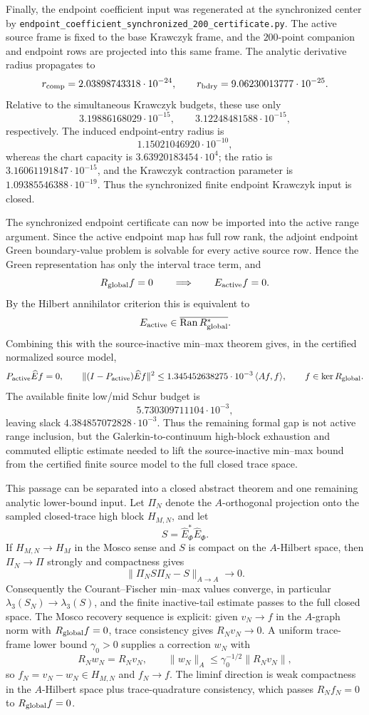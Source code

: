 \documentclass[11pt]{article}
\begin{document}
Finally, the endpoint coefficient input was regenerated at the synchronized
center by
\texttt{endpoint\_coefficient\_synchronized\_200\_certificate.py}.  The active
source frame is fixed to the base Krawczyk frame, and the \(200\)-point
companion and endpoint rows are projected into this same frame.  The analytic
derivative radius propagates to
\[
  r_{\rm comp}=2.03898743318\cdot10^{-24},\qquad
  r_{\rm bdry}=9.06230013777\cdot10^{-25}.
\]
Relative to the simultaneous Krawczyk budgets, these use only
\[
  3.19886168029\cdot10^{-15},\qquad
  3.12248481588\cdot10^{-15},
\]
respectively.  The induced endpoint-entry radius is
\[
  1.15021046920\cdot10^{-10},
\]
whereas the chart capacity is \(3.63920183454\cdot10^{4}\); the ratio is
\(3.16061191847\cdot10^{-15}\), and the Krawczyk contraction parameter is
\(1.09385546388\cdot10^{-19}\).  Thus the synchronized finite endpoint
Krawczyk input is closed.

The synchronized endpoint certificate can now be imported into the active range
argument.  Since the active endpoint map has full row rank, the adjoint endpoint
Green boundary-value problem is solvable for every active source row.  Hence
the Green representation has only the interval trace term, and
\[
  R_{\rm global}f=0 \qquad\Longrightarrow\qquad E_{\rm active}f=0.
\]
By the Hilbert annihilator criterion this is equivalent to
\[
  E_{\rm active}\in \overline{\operatorname{Ran}R_{\rm global}^{\ast}}.
\]
Combining this with the source-inactive min--max theorem gives, in the
certified normalized source model,
\[
  P_{\rm active}\widehat E f=0,\qquad
  \|(I-P_{\rm active})\widehat E f\|^2
  \le 1.345452638275\cdot10^{-3}\,\langle Af,f\rangle,
  \qquad f\in\ker R_{\rm global}.
\]
The available finite low/mid Schur budget is
\[
  5.730309711104\cdot10^{-3},
\]
leaving slack \(4.384857072828\cdot10^{-3}\).  Thus the remaining formal gap is
not active range inclusion, but the Galerkin-to-continuum high-block exhaustion
and commuted elliptic estimate needed to lift the source-inactive min--max bound
from the certified finite source model to the full closed trace space.

This passage can be separated into a closed abstract theorem and one remaining
analytic lower-bound input.  Let \(\Pi_N\) denote the \(A\)-orthogonal projection
onto the sampled closed-trace high block \(H_{M,N}\), and let
\[
  S=\widehat E_\Phi^\ast \widehat E_\Phi .
\]
If \(H_{M,N}\to H_M\) in the Mosco sense and \(S\) is compact on the
\(A\)-Hilbert space, then \(\Pi_N\to \Pi\) strongly and compactness gives
\[
  \|\Pi_N S\Pi_N-S\|_{A\to A}\to0.
\]
Consequently the Courant--Fischer min--max values converge, in particular
\(\lambda_3(S_N)\to\lambda_3(S)\), and the finite inactive-tail estimate passes
to the full closed space.  The Mosco recovery sequence is explicit: given
\(v_N\to f\) in the \(A\)-graph norm with \(R_{\rm global}f=0\), trace
consistency gives \(R_Nv_N\to0\).  A uniform trace-frame lower bound
\(\gamma_0>0\) supplies a correction \(w_N\) with
\[
  R_Nw_N=R_Nv_N,\qquad
  \|w_N\|_A\le \gamma_0^{-1/2}\|R_Nv_N\|,
\]
so \(f_N=v_N-w_N\in H_{M,N}\) and \(f_N\to f\).  The liminf direction is weak
compactness in the \(A\)-Hilbert space plus trace-quadrature consistency, which
passes \(R_Nf_N=0\) to \(R_{\rm global}f=0\).
\end{document}
